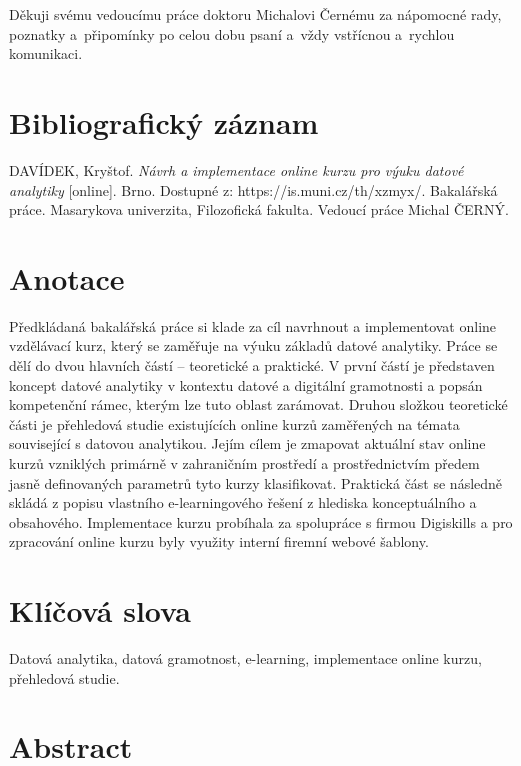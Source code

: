 \documentclass[a4paper,12pt,openany,twoside]{book} %
\begin{document}
\par
\par\vspace*{\fill}

Děkuji svému vedoucímu práce doktoru Michalovi Černému za nápomocné rady, poznatky a~připomínky po celou dobu psaní a~vždy vstřícnou a~rychlou komunikaci.

\clearpage

\section*{Bibliografický záznam}

DAVÍDEK, Kryštof. \textit{Návrh a implementace online kurzu pro výuku datové analytiky} [online]. Brno. Dostupné z: https://is.muni.cz/th/xzmyx/. Bakalářská práce. Masarykova univerzita, Filozofická fakulta. Vedoucí práce Michal ČERNÝ.

\section*{Anotace}

Předkládaná bakalářská práce si klade za cíl navrhnout a implementovat online vzdělávací kurz, který se zaměřuje na výuku základů datové analytiky. Práce se dělí do dvou hlavních částí – teoretické a praktické. V první částí je představen koncept datové analytiky v kontextu datové a digitální gramotnosti a popsán kompetenční rámec, kterým lze tuto oblast zarámovat. Druhou složkou teoretické části je přehledová studie existujících online kurzů zaměřených na témata související s datovou analytikou. Jejím cílem je zmapovat aktuální stav online kurzů vzniklých primárně v zahraničním prostředí a prostřednictvím předem jasně definovaných parametrů tyto kurzy klasifikovat. Praktická část se následně skládá z popisu vlastního e-learningového řešení z hlediska konceptuálního a obsahového. Implementace kurzu probíhala za spolupráce s firmou Digiskills a pro zpracování online kurzu byly využity interní firemní webové šablony.

\section*{Klíčová slova}
 
Datová analytika, datová gramotnost, e-learning, implementace online kurzu, přehledová studie.

\clearpage

\section*{Abstract}
\end{document}
